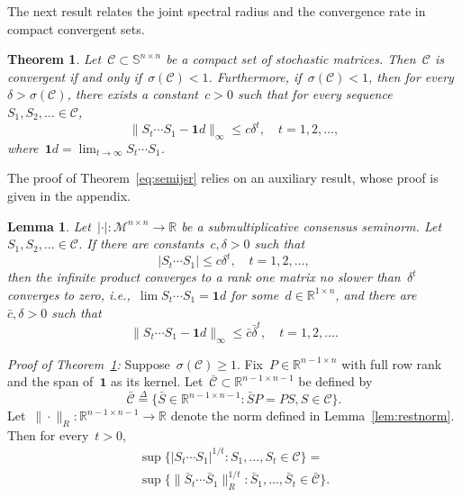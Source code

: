 \documentclass[letterpaper, 10 pt, conference]{ieeeconf}  %
\newtheorem{theorem}{Theorem}
\newtheorem{lemma}{Lemma}
\newcommand{\R}{\mathbb R}
\newcommand{\dfb}{\stackrel{\Delta}{=}}
\newcommand{\gensn}[1]{|#1|} %
\newcommand{\restnorm}[1]{\|#1\|_R} %
\newcommand{\eqrowsum}{\mathcal{M}} %
\newcommand{\stoc}{\mathbb{S}} %
\newcommand{\semijsr}{\sigma}
\begin{document}
The next result relates the joint spectral radius and the convergence rate in compact convergent sets.
\begin{theorem}\label{thm:semijsr}
    Let~$\mathcal{C} \subset \stoc^{n \times n}$ be a compact set of stochastic matrices. Then~$\mathcal{C}$ is convergent if and only if~$\semijsr(\mathcal{C}) < 1$. Furthermore, if~$\semijsr(\mathcal{C}) < 1$, then for every~$\delta > \semijsr(\mathcal{C})$, there exists a constant~$c > 0$ such that for every sequence~$S_1,S_2,\dots \in \mathcal{C}$,
    \begin{equation}
        \|S_t \cdots S_1 - \mathbf{1} d\|_\infty \le c\delta^t, \quad t=1,2,\dots,
    \end{equation}
    where~$\mathbf{1} d = \lim_{t \to \infty} S_t \cdots S_1$.
\end{theorem}
The proof of Theorem~\ref{eq:semijsr} relies on an auxiliary result, whose proof is given in the appendix.
\begin{lemma}\label{lem:expconverge}
    Let~$\gensn{\cdot} : \eqrowsum^{n \times n} \to \R$ be a submultiplicative consensus seminorm. Let~$S_1,S_2,\dots \in \mathcal{C}$. If there are constants~$c,\delta > 0$ such that
    \begin{equation}\label{cond:semiexpconverge}
        \gensn{S_t \cdots S_1} \le c\delta^t, \quad t=1,2,\dots,
    \end{equation}
    then the infinite product converges to a rank one matrix no slower than~$\delta^t$ converges to zero, i.e.,~$\lim S_t \cdots S_1 = \mathbf{1} d$ for some~$d \in \R^{1 \times n}$, and there are~$\bar c, \delta > 0$ such that
    \begin{equation}
        \|S_t \cdots S_1 - \mathbf{1}d\|_\infty \le \bar c\bar \delta^t, \quad t=1,2,\dots.
    \end{equation}
\end{lemma}
\textit{Proof of Theorem~\ref{thm:semijsr}:}
    Suppose~$\semijsr(\mathcal{C}) \ge 1$. Fix~$P \in \R^{n-1 \times n}$ with full row rank and the span of~$\mathbf{1}$ as its kernel. Let~$\mathcal{\bar C} \subset \R^{n-1 \times n-1}$ be defined by
    \begin{equation}
        \mathcal{\bar C} \dfb \{ \bar S \in \R^{n-1 \times n-1} : \bar SP = PS, S \in \mathcal{C}\}. 
    \end{equation}
    Let~$\restnorm{\cdot} : \R^{n-1 \times n-1} \to \R$ denote the norm defined in Lemma~\ref{lem:restnorm}. Then for every~$t > 0$,
    \begin{multline*}
        \sup \{\gensn{S_t \cdots S_1}^{1/t} : S_1,\dots,S_t \in \mathcal{C}\}
            = \\ \sup \{\restnorm{\bar S_t \cdots \bar S_1}^{1/t} : \bar S_1,\dots,\bar S_t \in \mathcal{\bar C}\}.
    \end{multline*}
\end{document}
